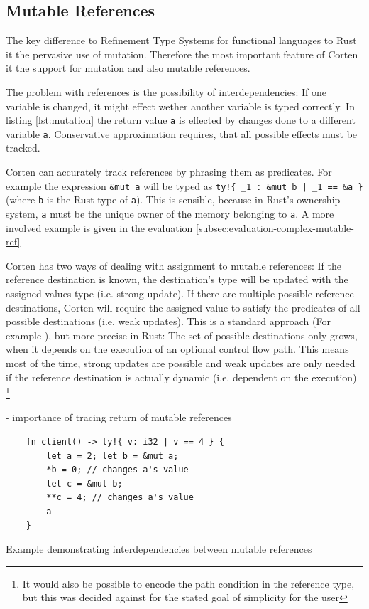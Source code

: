 \documentclass{book}
\newcommand{\code}[1]{\texttt{#1}}
\theoremstyle{definition}
\begin{document}
\label{subsec:mutable-references}\subsection{Mutable References}

The key difference to Refinement Type Systems for functional languages to Rust it the pervasive use of mutation. Therefore the most important feature of Corten it the support for mutation and also mutable references.

The problem with references is the possibility of interdependencies: If one variable is changed, it might effect wether another variable is typed correctly. In listing \ref{lst:mutation} the return value \code{a} is effected by changes done to a different variable \code{a}. Conservative approximation requires, that all possible effects must be tracked.

Corten can accurately track references by phrasing them as predicates. For example the expression \code{\&mut a} will be typed as \code{ty!\{ \_1 : \&mut b | \_1 == \&a \}} (where \code{b} is the Rust type of \code{a}). This is sensible, because in Rust's ownership system, \code{a} must be the unique owner of the memory belonging to \code{a}. 
A more involved example is given in the evaluation \ref{subsec:evaluation-complex-mutable-ref}

Corten has two ways of dealing with assignment to mutable references: If the reference destination is known, the destination's type will be updated with the assigned values type (i.e. strong update). If there are multiple possible reference destinations, Corten will require the assigned value to satisfy the predicates of all possible destinations (i.e. weak updates). This is a standard approach (For example \cite{kloos_asynchronous_2015}), but more precise in Rust: The set of possible destinations only grows, when it depends on the execution of an optional control flow path. This means most of the time, strong updates are possible and weak updates are only needed if the reference destination is actually dynamic (i.e. dependent on the execution) \footnote{It would also be possible to encode the path condition in the reference type, but this was decided against for the stated goal of simplicity for the user}


- importance of tracing return of mutable references

\begin{listing}[h]
  \begin{verbatim}
    fn client() -> ty!{ v: i32 | v == 4 } {
        let a = 2; let b = &mut a;
        *b = 0; // changes a's value
        let c = &mut b;
        **c = 4; // changes a's value
        a
    }
  \end{verbatim}
  \caption{Example demonstrating interdependencies between mutable references}
  \label{lst:mutation}
\end{listing}
\end{document}
